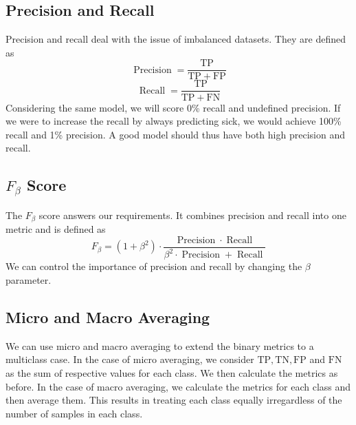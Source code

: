 \subsection{Precision and Recall}
Precision and recall deal with the issue of imbalanced datasets.
They are defined as
\begin{equation*}
    \label{eq:precision}
    \operatorname{Precision} = \frac{\mathrm{TP}}{\mathrm{TP} + \mathrm{FP}}
\end{equation*}
\begin{equation*}
    \label{eq:recall}
    \operatorname{Recall} = \frac{\mathrm{TP}}{\mathrm{TP} + \mathrm{FN}}
\end{equation*}
Considering the same model, we will score 0\% recall and undefined precision.
If we were to increase the recall by always predicting sick, we would achieve 100\% recall and 1\% precision.
A good model should thus have both high precision and recall.

\subsection{$F_{\beta}$ Score}
The $F_{\beta}$ score answers our requirements.
It combines precision and recall into one metric and is defined as
\begin{equation*}
    \label{eq:f1}
    F_{\beta} = (1 + \beta^2) \cdot \frac{\operatorname{Precision} \cdot \operatorname{Recall}}{\beta^2 \cdot \operatorname{Precision} + \operatorname{Recall}}
\end{equation*}
We can control the importance of precision and recall by changing the $\beta$ parameter.

\subsection{Micro and Macro Averaging}
We can use micro and macro averaging to extend the binary metrics to a multiclass case.
In the case of micro averaging, we consider $\mathrm{TP}, \mathrm{TN}, \mathrm{FP}$ and $\mathrm{FN}$ as the sum of respective values for each class.
We then calculate the metrics as before.
In the case of macro averaging, we calculate the metrics for each class and then average them.
This results in treating each class equally irregardless of the number of samples in each class.


